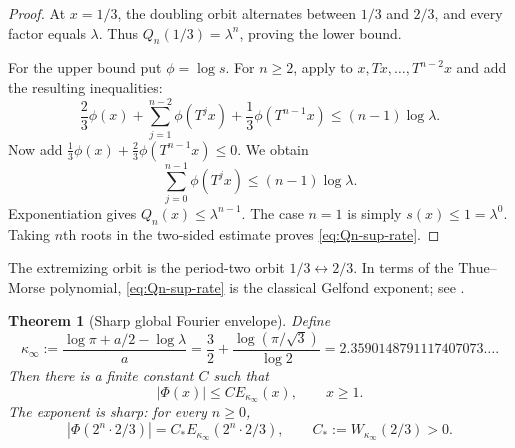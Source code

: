 \documentclass[11pt,oneside]{article}
\numberwithin{equation}{section}
\newtheorem{theorem}{Theorem}[section]
\theoremstyle{definition}
\theoremstyle{remark}
\newcommand{\abs}[1]{\left|#1\right|}
\newcommand{\PhiUp}{\Phi}
\newcommand{\defeq}{\mathrel{:=}}
\begin{document}
\begin{proof}
At \(x=1/3\), the doubling orbit alternates between \(1/3\) and \(2/3\), and every
factor equals \(\lambda\).  Thus \(Q_n(1/3)=\lambda^n\), proving the lower bound.

For the upper bound put \(\phi=\log s\).  For \(n\ge2\), apply
 to
\(x,Tx,\ldots,T^{n-2}x\) and add the resulting inequalities:
\[
 \frac23\phi(x)+\sum_{j=1}^{n-2}\phi(T^jx)
 +\frac13\phi(T^{n-1}x)
 \le(n-1)\log\lambda.
\]
Now add
\(\frac13\phi(x)+\frac23\phi(T^{n-1}x)\le0\).  We obtain
\[
 \sum_{j=0}^{n-1}\phi(T^jx)\le(n-1)\log\lambda.
\]
Exponentiation gives \(Q_n(x)\le\lambda^{n-1}\).  The case \(n=1\) is simply
\(s(x)\le1=\lambda^0\).  Taking \(n\)th roots in the two-sided estimate proves
\eqref{eq:Qn-sup-rate}.
\end{proof}

The extremizing orbit is the period-two orbit \(1/3\leftrightarrow2/3\).  In terms of the
Thue--Morse polynomial, \eqref{eq:Qn-sup-rate} is the classical Gelfond exponent; see
\cite{gelfond,fan-schmeling-shen}.

\begin{theorem}[Sharp global Fourier envelope]
\label{thm:uniform-envelope}
Define
\begin{equation}
 \kappa_\infty
 \defeq\frac{\log\pi+a/2-\log\lambda}{a}
 =\frac32+\frac{\log(\pi/\sqrt3)}{\log2}
 =2.3590148791117407073\ldots .
 \label{eq:kappa-infty}
\end{equation}
Then there is a finite constant \(C\) such that
\begin{equation}
 \abs{\PhiUp(x)}\le C E_{\kappa_\infty}(x),
 \qquad x\ge1.
 \label{eq:global-envelope}
\end{equation}
The exponent is sharp: for every \(n\ge0\),
\begin{equation}
 \abs{\PhiUp(2^n\cdot2/3)}
 =C_*E_{\kappa_\infty}(2^n\cdot2/3),
 \qquad
 C_*\defeq W_{\kappa_\infty}(2/3)>0.
 \label{eq:exact-extremal-ray}
\end{equation}
\end{theorem}
\end{document}
